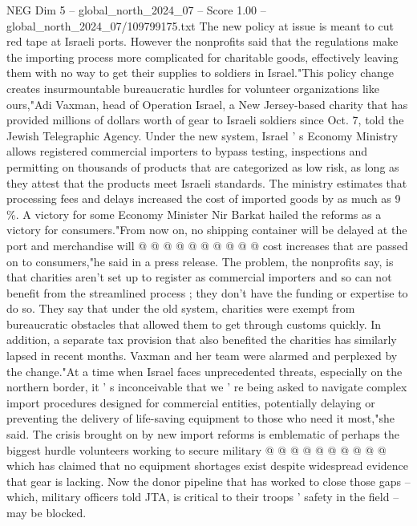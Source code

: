 \begin{textsample}{NEG Dim 5 – global\_north\_2024\_07 – Score 1.00 – global\_north\_2024\_07/109799175.txt}  \label{ex:f5_neg_149}
The new policy at issue is meant to cut red tape at Israeli ports.
However the nonprofits said that the regulations make the importing process more complicated for charitable goods, effectively leaving them with no way to get their supplies to soldiers in Israel."This policy change creates insurmountable bureaucratic hurdles for volunteer organizations like ours,"Adi Vaxman, head of Operation Israel, a New Jersey-based charity that has provided millions of dollars worth of gear to Israeli soldiers since Oct. 7, told the Jewish Telegraphic Agency.
Under the new system, Israel ' s Economy Ministry allows registered commercial importers to bypass testing, inspections and permitting on thousands of products that are categorized as low risk, as long as they attest that the products meet Israeli standards.
The ministry estimates that processing fees and delays increased the cost of imported goods by as much as 9 \%.
A victory for some Economy Minister Nir Barkat hailed the reforms as a victory for consumers."From now on, no shipping container will be delayed at the port and merchandise will @ @ @ @ @ @ @ @ @ @ cost increases that are passed on to consumers,"he said in a press release.
The problem, the nonprofits say, is that charities aren't set up to register as commercial importers and so can not benefit from the streamlined process ; they don't have the funding or expertise to do so.
They say that under the old system, charities were exempt from bureaucratic obstacles that allowed them to get through customs quickly.
In addition, a separate tax provision that also benefited the charities has similarly lapsed in recent months.
Vaxman and her team were alarmed and perplexed by the change."At a time when Israel faces unprecedented threats, especially on the northern border, it ' s inconceivable that we ' re being asked to navigate complex import procedures designed for commercial entities, potentially delaying or preventing the delivery of life-saving equipment to those who need it most,"she said.
The crisis brought on by new import reforms is emblematic of perhaps the biggest hurdle volunteers working to secure military @ @ @ @ @ @ @ @ @ @ which has claimed that no equipment shortages exist despite widespread evidence that gear is lacking.
Now the donor pipeline that has worked to close those gaps -- which, military officers told JTA, is critical to their troops ' safety in the field -- may be blocked.

\end{textsample}
